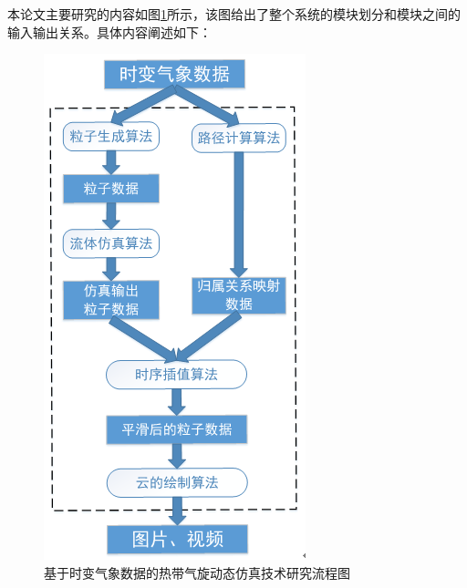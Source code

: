 本论文主要研究的内容如图\ref{fig:research_contents}所示，该图给出了整个系统的模块划分和模块之间的输入输出关系。具体内容阐述如下：
\begin{figure}[h!]
	\centering
	\includegraphics[width = 150bp]{figure/researchContemts.png}
	\caption{基于时变气象数据的热带气旋动态仿真技术研究流程图}
	\label{fig:research_contents}
\end{figure}



